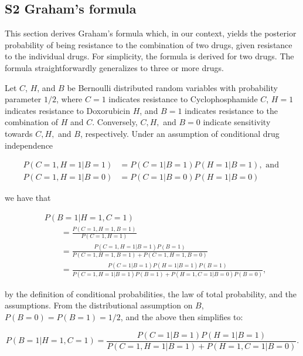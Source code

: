\documentclass[10pt,letterpaper]{article}
\begin{document}




\clearpage



\subsection*{S2 Graham's formula}
\label{sec:graham}
This section derives Graham's formula which, in our context, yields the posterior probability of being resistance to the combination of two drugs, given resistance to the individual drugs. For simplicity, the formula is derived for two drugs. The formula straightforwardly generalizes to three or more drugs.

Let $C$, $H$, and $B$ be Bernoulli distributed random variables with probability parameter $1/2$, where $C = 1$ indicates resistance to Cyclophosphamide $C$, $H = 1$ indicates resistance to Doxorubicin $H$, and $B = 1$ indicates resistance to the combination of $H$ and $C$. Conversely, $C,H,$ and $B = 0$ indicate sensitivity towards $C,H,$ and $B$, respectively. Under an assumption of conditional drug independence

\begin{align*}
  P(C=1, H=1| B=1) &= P(C=1 | B=1) P(H=1 | B=1), \text{ and } \\
  P(C=1, H=1| B=0) &= P(C=1 | B=0) P(H=1 | B=0)
\end{align*}

we have that

\begin{align*}
  &P(B=1 | H=1, C=1)
  \\&\qquad
   = \frac{P(C=1, H=1, B=1)}
          {P(C=1, H=1)}
  \\&\qquad
   = \frac{P(C=1, H=1 | B=1) P(B=1)}
          {P(C=1, H=1, B=1) + P(C=1, H=1, B=0)}
  \\&\qquad
   = \frac{P(C=1 | B=1) P(H=1 | B=1) P(B=1)}
          {P(C=1, H=1 | B=1) P(B=1) + P(H=1, C=1| B=0) P(B=0)},
\end{align*}

by the definition of conditional probabilities, the law of total probability, and the assumptions. From the distributional assumption on $B$, $P(B=0) = P(B=1) = 1/2$, and the above then simplifies to:

\begin{equation*}
  P(B=1 | H=1, C=1)
   = \frac{P(C=1 | B=1) P(H=1 | B=1)}
          {P(C=1, H=1 | B=1) + P(H=1, C=1 | B=0)}.
\end{equation*}
\end{document}
